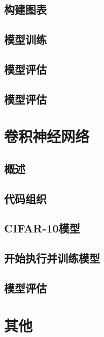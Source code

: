 \documentclass[a4paper,11pt,twoside]{ctexart}
\begin{document}
\subsection {构建图表}
\subsection {模型训练}
\subsection {模型评估}
\subsection {模型评估}

\section{卷积神经网络}
\subsection {概述}
\subsection {代码组织}
\subsection {CIFAR-10模型}
\subsection {开始执行并训练模型}
\subsection {模型评估}



\section{其他}
\end{document}
